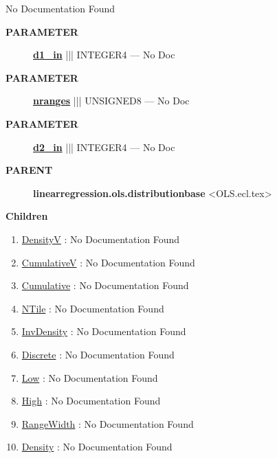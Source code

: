 \par





No Documentation Found






\par
\begin{description}
\item [\colorbox{tagtype}{\color{white} \textbf{\textsf{PARAMETER}}}] \textbf{\underline{d1\_in}} ||| INTEGER4 --- No Doc
\item [\colorbox{tagtype}{\color{white} \textbf{\textsf{PARAMETER}}}] \textbf{\underline{nranges}} ||| UNSIGNED8 --- No Doc
\item [\colorbox{tagtype}{\color{white} \textbf{\textsf{PARAMETER}}}] \textbf{\underline{d2\_in}} ||| INTEGER4 --- No Doc
\end{description}









\par
\begin{description}
\item [\colorbox{tagtype}{\color{white} \textbf{\textsf{PARENT}}}] \textbf{linearregression.ols.distributionbase} <OLS.ecl.tex>
\end{description}


\textbf{Children}
\begin{enumerate}
\item \hyperlink{ecldoc:linearregression.ols.distributionbase.densityv}{DensityV}
: No Documentation Found
\item \hyperlink{ecldoc:linearregression.ols.distributionbase.cumulativev}{CumulativeV}
: No Documentation Found
\item \hyperlink{ecldoc:linearregression.ols.distributionbase.cumulative}{Cumulative}
: No Documentation Found
\item \hyperlink{ecldoc:linearregression.ols.distributionbase.ntile}{NTile}
: No Documentation Found
\item \hyperlink{ecldoc:linearregression.ols.distributionbase.invdensity}{InvDensity}
: No Documentation Found
\item \hyperlink{ecldoc:linearregression.ols.distributionbase.discrete}{Discrete}
: No Documentation Found
\item \hyperlink{ecldoc:linearregression.ols.fdistribution.low}{Low}
: No Documentation Found
\item \hyperlink{ecldoc:linearregression.ols.fdistribution.high}{High}
: No Documentation Found
\item \hyperlink{ecldoc:linearregression.ols.fdistribution.rangewidth}{RangeWidth}
: No Documentation Found
\item \hyperlink{ecldoc:linearregression.ols.fdistribution.density}{Density}
: No Documentation Found
\end{enumerate}

